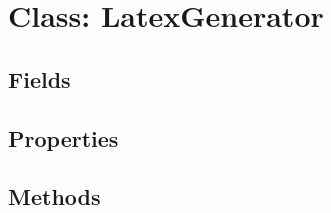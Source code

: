 \documentclass[11pt, oneside, a4paper]{book}
\begin{document}
\hypertarget{SoftwareEngineeringTools.{}Documentation.{}LatexGenerator}{}
\section{Class: LatexGenerator}

\subsection{Fields}

\subsection{Properties}

\subsection{Methods}
\end{document}
